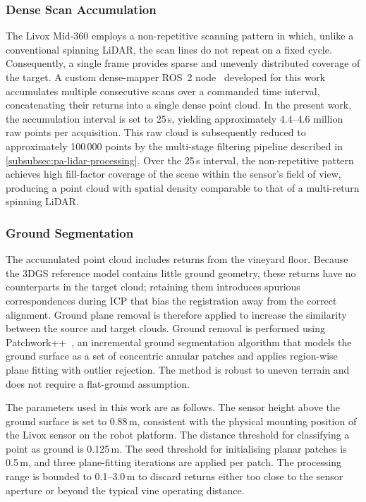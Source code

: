 \subsubsection{Dense Scan Accumulation}
\label{subsubsec:pa-dense-accumulation}

The Livox Mid-360 employs a non-repetitive scanning pattern in which, unlike a conventional spinning LiDAR, the scan lines do not repeat on a fixed cycle. Consequently, a single frame provides sparse and unevenly distributed coverage of the target. A custom dense-mapper ROS~2 node~\cite{macenskiRobotOperatingSystem2022} developed for this work accumulates multiple consecutive scans over a commanded time interval, concatenating their returns into a single dense point cloud. In the present work, the accumulation interval is set to 25\,s, yielding approximately 4.4--4.6 million raw points per acquisition. This raw cloud is subsequently reduced to approximately 100\,000 points by the multi-stage filtering pipeline described in \cref{subsubsec:pa-lidar-processing}. Over the 25\,s interval, the non-repetitive pattern achieves high fill-factor coverage of the scene within the sensor's field of view, producing a point cloud with spatial density comparable to that of a multi-return spinning LiDAR.

\subsubsection{Ground Segmentation}
\label{subsubsec:pa-ground-segmentation}

The accumulated point cloud includes returns from the vineyard floor. Because the 3DGS reference model contains little ground geometry, these returns have no counterparts in the target cloud; retaining them introduces spurious correspondences during ICP that bias the registration away from the correct alignment. Ground plane removal is therefore applied to increase the similarity between the source and target clouds. Ground removal is performed using Patchwork++~\cite{leePatchworkFastRobust2022},
an incremental ground segmentation algorithm that models the ground surface as a set of concentric annular patches and applies region-wise plane fitting with outlier rejection. The method is robust to uneven terrain and does not require a flat-ground assumption.

The parameters used in this work are as follows. The sensor height above the ground surface is set to 0.88\,m,
consistent with the physical mounting position of the Livox sensor on the robot platform. The distance threshold for classifying a point as ground is 0.125\,m.
The seed threshold for initialising planar patches is 0.5\,m, and three plane-fitting iterations are applied per patch.
The processing range is bounded to 0.1--3.0\,m to discard returns either too close to the sensor aperture or beyond the typical vine operating distance.


